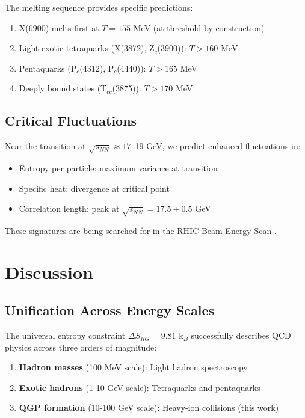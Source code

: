 \documentclass[12pt,a4paper]{article}
\begin{document}
The melting sequence provides specific predictions:
\begin{enumerate}
\item X(6900) melts first at $T = 155$ MeV (at threshold by construction)
\item Light exotic tetraquarks (X(3872), Z$_c$(3900)): $T > 160$ MeV
\item Pentaquarks (P$_c$(4312), P$_c$(4440)): $T > 165$ MeV  
\item Deeply bound states (T$_{cc}$(3875)): $T > 170$ MeV
\end{enumerate}

\subsection{Critical Fluctuations}

Near the transition at $\sqrt{s_{NN}} \approx 17$--19 GeV, we predict enhanced fluctuations in:
\begin{itemize}
\item Entropy per particle: maximum variance at transition
\item Specific heat: divergence at critical point
\item Correlation length: peak at $\sqrt{s_{NN}} = 17.5 \pm 0.5$ GeV
\end{itemize}

These signatures are being searched for in the RHIC Beam Energy Scan \cite{BES2020,STAR2021}.

\section{Discussion}

\subsection{Unification Across Energy Scales}

The universal entropy constraint $\Delta S_{RG} = 9.81$ k$_B$ successfully describes QCD physics across three orders of magnitude:

\begin{enumerate}
\item \textbf{Hadron masses} (100 MeV scale): Light hadron spectroscopy \cite{Paper1}
\item \textbf{Exotic hadrons} (1-10 GeV scale): Tetraquarks and pentaquarks \cite{Paper2}
\item \textbf{QGP formation} (10-100 GeV scale): Heavy-ion collisions (this work)
\end{enumerate}
\end{document}
